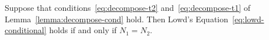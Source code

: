 \documentclass[runningheads,a4paper]{llncs}
\begin{document}
%

\begin{lemma} \label{lemma:family-agree}
Suppose that conditions~\eqref{eq:decompose-t2} and~\eqref{eq:decompose-t1} of Lemma~\ref{lemma:decompose-cond} hold. Then Lowd's Equation~\eqref{eq:lowd-conditional} holds if and only if $N_{1} = N_{2}$. 
\end{lemma}
\end{document}
